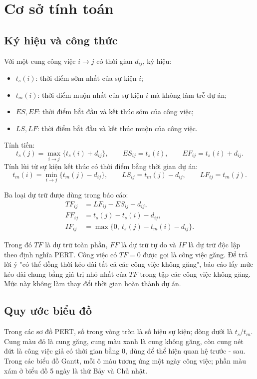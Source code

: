 \documentclass[12pt,a4paper]{article}
\begin{document}
\section{Cơ sở tính toán}

\subsection{Ký hiệu và công thức}

Với một cung công việc $i \rightarrow j$ có thời gian $d_{ij}$, ký hiệu:

\begin{itemize}[leftmargin=1.8em]
  \item $t_s(i)$: thời điểm sớm nhất của sự kiện $i$;
  \item $t_m(i)$: thời điểm muộn nhất của sự kiện $i$ mà không làm trễ dự án;
  \item $ES,EF$: thời điểm bắt đầu và kết thúc sớm của công việc;
  \item $LS,LF$: thời điểm bắt đầu và kết thúc muộn của công việc.
\end{itemize}

Tính tiến:
\[
  t_s(j)=\max_{i\rightarrow j}\{t_s(i)+d_{ij}\},\qquad
  ES_{ij}=t_s(i),\qquad EF_{ij}=t_s(i)+d_{ij}.
\]
Tính lùi từ sự kiện kết thúc có thời điểm bằng thời gian dự án:
\[
  t_m(i)=\min_{i\rightarrow j}\{t_m(j)-d_{ij}\},\qquad
  LS_{ij}=t_m(j)-d_{ij},\qquad LF_{ij}=t_m(j).
\]

Ba loại dự trữ được dùng trong báo cáo:
\[
\begin{aligned}
  TF_{ij}&=LF_{ij}-ES_{ij}-d_{ij},\\
  FF_{ij}&=t_s(j)-t_s(i)-d_{ij},\\
  IF_{ij}&=\max\{0,\ t_s(j)-t_m(i)-d_{ij}\}.
\end{aligned}
\]

Trong đó $TF$ là dự trữ toàn phần, $FF$ là dự trữ tự do và $IF$ là dự trữ
độc lập theo định nghĩa PERT. Công việc có $TF=0$ được gọi là công việc găng.
Để trả lời ý "có thể đồng thời kéo dài tất cả các công việc không găng",
báo cáo lấy mức kéo dài chung bằng giá trị nhỏ nhất của $TF$ trong tập các
công việc không găng. Mức này không làm thay đổi thời gian hoàn thành dự án.

\subsection{Quy ước biểu đồ}

Trong các sơ đồ PERT, số trong vòng tròn là số hiệu sự kiện; dòng dưới là
$t_s/t_m$. Cung màu đỏ là cung găng, cung màu xanh là cung không găng, còn
cung nét đứt là công việc giả có thời gian bằng 0, dùng để thể hiện quan hệ
trước - sau. Trong các biểu đồ Gantt, mỗi ô màu tương ứng một ngày công việc;
phần màu xám ở biểu đồ 5 ngày là thứ Bảy và Chủ nhật.
\end{document}
